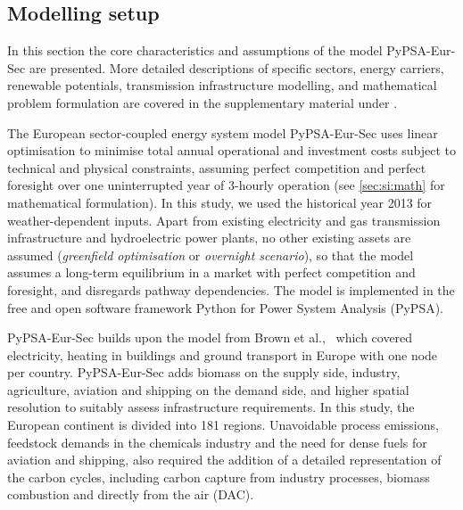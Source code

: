 \subsection*{Modelling setup}

In this section the core characteristics and assumptions of the model
PyPSA-Eur-Sec are presented. More detailed descriptions of specific sectors,
energy carriers, renewable potentials, transmission infrastructure modelling,
and mathematical problem formulation are covered in the supplementary material
under .

The European sector-coupled energy system model PyPSA-Eur-Sec uses linear
optimisation to minimise total annual operational and investment costs
subject to technical and physical constraints, assuming perfect competition and
perfect foresight over one uninterrupted year of 3-hourly operation (see
\cref{sec:si:math} for mathematical formulation). In this study, we used the
historical year 2013 for weather-dependent inputs. Apart from existing
electricity and gas transmission infrastructure and hydroelectric power plants,
no other existing assets are assumed (\textit{greenfield optimisation} or
\textit{overnight scenario}), so that the model assumes a long-term equilibrium
in a market with perfect competition and foresight, and disregards pathway
dependencies. The model is implemented in the free and open software framework
Python for Power System Analysis (PyPSA).\cite{brownPyPSAPython2018}

PyPSA-Eur-Sec builds upon the model from Brown et
al.,~\cite{brownSynergiesSector2018} which covered electricity, heating in
buildings and ground transport in Europe with one node per country.
PyPSA-Eur-Sec adds biomass on the supply side, industry, agriculture, aviation
and shipping on the demand side, and higher spatial resolution to suitably
assess infrastructure requirements. In this study, the European continent is
divided into 181 regions. Unavoidable process emissions, feedstock demands in
the chemicals industry and the need for dense fuels for aviation and shipping,
also required the addition of a detailed representation of the carbon cycles,
including carbon capture from industry processes, biomass combustion and
directly from the air (DAC).

